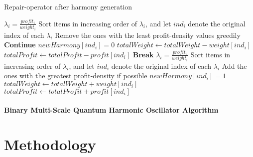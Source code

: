 \documentclass[titlepage]{article}
\begin{document}
\begin{breakablealgorithm}
\caption{Repair-operator after harmony generation}\label{harmonyRepair}
    \begin{algorithmic}[1]
             
                \State $\lambda_{i} = \frac{profit_{i}}{weight_{i}}$
            \EndFor
            \State Sort items in increasing order of $\lambda_{i}$, and let $ind_{i}$ denote the original index of each $\lambda_{i}$
            \State Remove the ones with the least profit-density values greedily
                    \State \textbf{Continue}
                \EndIf
                \State $newHarmony[ind_{i}] = 0$ 
                \State $totalWeight \gets totalWeight - weight[ind_{i}]$
                \State $totalProfit \gets totalProfit - profit[ind_{i}]$
                    \State \textbf{Break} 
                \EndIf
            \EndFor
        \EndIf
             
                \State $\lambda_{i} = \frac{profit_{i}}{weight_{i}}$
            \EndFor
            \State Sort items in increasing order of $\lambda_{i}$, and let $ind_{i}$ denote the original index of each $\lambda_{i}$
                \State Add the ones with the greatest profit-density if possible 
                        \State $newHarmony[ind_{i}] = 1$
                        \State $totalWeight \gets totalWeight + weight[ind_{i}]$
                        \State $totalProfit \gets totalProfit + profit[ind_{i}]$
                    \EndIf
                \EndIf
            \EndFor
        \EndIf
    \end{algorithmic}
\end{breakablealgorithm}

\paragraph*{Binary Multi-Scale Quantum Harmonic Oscillator Algorithm}



\section{Methodology}
\end{document}
